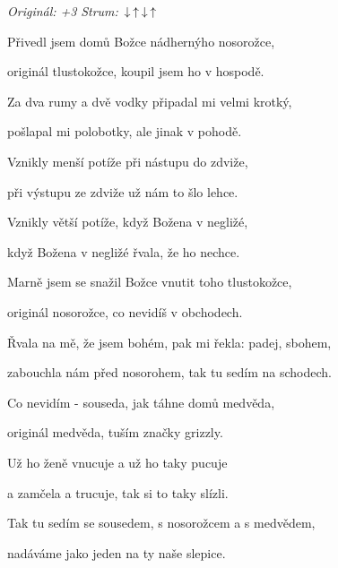 \begin{song}


\begin{headerbox}
 \quad
\textit{Originál: +3} \quad
\textit{Strum:} $\Down\Up\Down\Up$
\end{headerbox}

\begin{hchordbox}
\end{hchordbox}

\Large

\bigskip

Přivedl jsem domů Božce nádhernýho nosorožce, \par
{}originál tlustokožce, koupil jsem ho v hospodě. \par
{}Za dva rumy a dvě vodky připadal mi velmi krotký, \par
{}pošlapal mi polobotky, ale jinak v pohodě. \par

\bigskip

Vznikly menší potíže při nástupu do zdviže, \par
{}při výstupu ze zdviže už nám to šlo lehce. \par
{}Vznikly větší potíže, když Božena v negližé, \par
{}když Božena v negližé řvala, že ho nechce. \par

\bigskip

Marně jsem se snažil Božce vnutit toho tlustokožce, \par
{}originál nosorožce, co nevidíš v obchodech. \par
{}Řvala na mě, že jsem bohém, pak mi řekla: padej, sbohem, \par
{}zabouchla nám před nosorohem, tak tu sedím na schodech. \par

\bigskip

Co nevidím - souseda, jak táhne domů medvěda, \par
{}originál medvěda, tuším značky grizzly. \par
{}Už ho ženě vnucuje a už ho taky pucuje \par
a zamčela a trucuje, tak si to taky slízli. \par

\bigskip

Tak tu sedím se sousedem, s nosorožcem a s medvědem, \par
{}nadáváme jako jeden na ty naše slepice. \par

\end{song}
